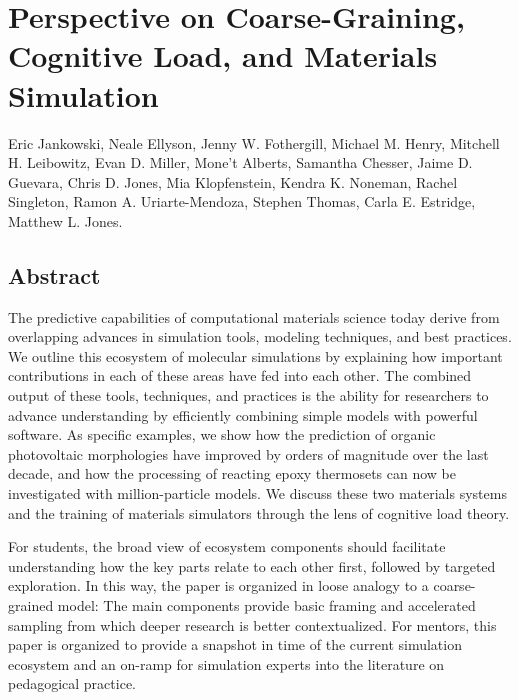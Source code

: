 \chapter{Perspective on Coarse-Graining, Cognitive Load, and Materials Simulation}
\label{chap:perspective}


Eric Jankowski, Neale Ellyson, Jenny W. Fothergill, Michael M. Henry, Mitchell H. Leibowitz, Evan D. Miller, Mone't Alberts, Samantha Chesser, Jaime D. Guevara, Chris D. Jones, Mia Klopfenstein, Kendra K. Noneman, Rachel Singleton, Ramon A. Uriarte-Mendoza, Stephen Thomas, Carla E. Estridge, Matthew L. Jones.

\section{Abstract}
The predictive capabilities of computational materials science today derive from overlapping advances in simulation tools, modeling techniques, and best practices.
We outline this ecosystem of molecular simulations by explaining how important contributions in each of these areas have fed into each other.
The combined output of these tools, techniques, and practices is the ability for researchers to advance understanding by efficiently combining simple models with powerful software.
As specific examples, we show how the prediction of organic photovoltaic morphologies have improved by orders of magnitude over the last decade, and how the processing of reacting epoxy thermosets can now be investigated with million-particle models.
We discuss these two materials systems and the training of materials simulators through the lens of cognitive load theory.

For students, the broad view of ecosystem components should facilitate understanding how the key parts relate to each other first, followed by targeted exploration.
In this way, the paper is organized in loose analogy to a coarse-grained model: The main components provide basic framing and accelerated sampling from which deeper research is better contextualized. 
For mentors, this paper is organized to provide a snapshot in time of the current simulation ecosystem and an on-ramp for simulation experts into the literature on pedagogical practice.

